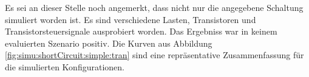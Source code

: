 Es   sei   an   dieser   Stelle   noch   angemerkt,   dass   nicht   nur   die
angegebene    Schaltung   simuliert    worden   ist. Es    sind   verschiedene
Lasten,  Transistoren  und   Transistorsteuersignale  ausprobiert  worden. Das
Ergebniss  war   in  keinem  evaluierten  Szenario   positiv. Die  Kurven  aus
Abbildung  \ref{fig:simu:shortCircuit:simple:tran} sind  eine repr\"asentative
Zusammenfassung f\"ur die simulierten Konfigurationen.


%


